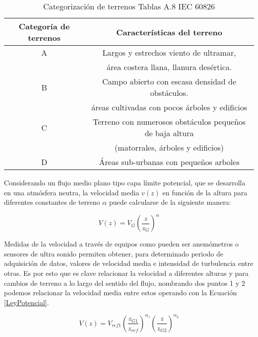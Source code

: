 \begin{table}[h] 
	\begin{footnotesize} 
		\begin{center} 
			\begin{tabular}{|c||c|}
				\hline
				\textbf{Categoría de terrenos}& \textbf{Características del terreno}  \\\hline
				A & Largos y estrechos viento de ultramar,  \\
				& área costera llana, llanura desértica.    \\ \hline
				B & Campo abierto con escasa densidad de obstáculos. \\
				& áreas cultivadas con pocos árboles y edificios     \\ \hline
				C &  Terreno con numerosos obstáculos pequeños de baja altura \\
				& (matorrales, árboles y edificios)  \\ \hline
				D & Áreas sub-urbanas con pequeños arboles     \\ \hline
			\end{tabular}
		\end{center} 
		\caption{Categorización de terrenos Tablas A.8 IEC 60826}
	\end{footnotesize} 
	\label{TablaTerrenos} 
\end{table}




Considerando un flujo medio plano tipo capa límite potencial, que se desarrolla en una atmósfera neutra, la velocidad media $v(z)$ en función de la altura para diferentes constantes de terreno $\alpha$ puede calcularse de la siguiente manera:

\begin{equation}\label{LeyPotencial}
	V(z)=V_{G}\left(\frac{z}{z_{G}}\right)^\alpha
\end{equation}

Medidas de la velocidad a través de equipos como pueden ser anemómetros o sensores de ultra sonido permiten obtener, para determinado periodo de adquisición de datos, valores de velocidad media e intensidad de turbulencia entre otras. Es por esto que es clave relacionar la velocidad a diferentes alturas y para cambios de terreno a lo largo del sentido del flujo, nombrando dos puntos 1 y 2 podemos relacionar la velocidad media entre estos operando con la Ecuación \eqref{LeyPotencial}.

\begin{equation}\label{RelacionPotencial}
	V(z)=V_{ref1}\left(\frac{z_{G1}}{z_{ref}}\right)^{\alpha_1}\left(\frac{z}{z_{G2}}\right)^{\alpha_2}
\end{equation}

